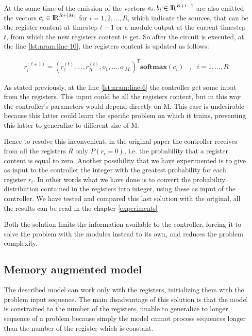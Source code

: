 At the same time of the emission of the vectors $a_{i}, b_{i} \in \textrm{I\!R}^{R+i-1}$ are also emitted the vectors $c_i \in \textrm{I\!R}^{R+|M|}$ for $i = 1, 2, \dots, R$, which indicate the sources, that can be the register content at timestep $t-1$ or a module output at the current timestep $t$, from which the new registers content is get. So after the circuit is executed, at the line \ref{lst:nram:line-10}, the registers content is updated as follows:
\begin{center}
	\begin{equation}
		\begin{split}
			r_i^{(t + 1)} = (r_1^{(t)}, \dots, r_R^{(t)}, o_1, \dots, o_{|M|})^T\textbf{softmax}(c_i) &,\ \ \ i = 1,\dots,R
		\end{split}
	\end{equation}
\end{center}



As stated previously, at the line \ref{lst:nram:line-6} the controller get some input from the registers. This input could be all the registers content, but in this way the controller's parameters would depend directly on M. This case is undesirable because this latter could learn the specific problem on which it trains, preventing this latter to generalize to different size of M. 

Hence to resolve this inconvenient, in the original paper the controller receives from all the registers $R$ only $P(r_{i} = 0)$, i.e. the probability that a register content is equal to zero. Another possibility that we have experimented is to give as input to the controller the integer with the greatest probability for each register $r_{i}$. In other words what we have done is to convert the probability distribution contained in the registers into integer, using these as input of the controller. We have tested and compared this last solution with the original, all the results can be read in the chapter \ref{experiments}

Both the solution limits the information available to the controller, forcing it to solve the problem with the modules instead to its own, and reduces the problem complexity.

\subsection{Memory augmented model}
The described model can work only with the registers, initializing them with the problem input sequence. The main disadvantage of this solution is that the model is constrained to the number of the registers, unable to generalize to longer sequence of a problem because simply the model cannot process sequences longer than the number of the register which is constant.

